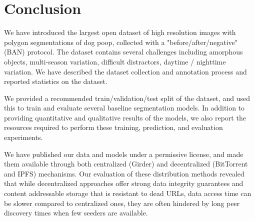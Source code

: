 \documentclass[10pt,twocolumn,letterpaper]{article}
\begin{document}





\section{Conclusion}

We have introduced the largest open dataset of high resolution images with polygon
  segmentations of dog poop, collected with a "before/after/negative" (BAN) protocol.
The dataset contains several challenges including amorphous objects, multi-season variation, difficult
  distractors, daytime / nighttime variation.
We have described the dataset collection and annotation process and reported statistics on the dataset.

We provided a recommended train/validation/test split of the dataset, and used this to train and evaluate
  several baseline segmentation models.
In addition to providing quantitative and qualitative results of the models, we also report the resources
  required to perform these training, prediction, and evaluation experiments.

We have published our data and models under a permissive license, and made them available through both
  centralized (Girder) and decentralized (BitTorrent and IPFS) mechanisms.
Our evaluation of these distribution methods revealed that while decentralized approaches offer strong data
  integrity guarantees and content addressable storage that is resistant to dead URLs, data access time can be
  slower compared to centralized ones, they are often hindered by long peer discovery times when few seeders
  are available.
\end{document}
